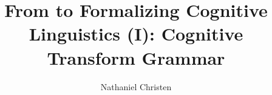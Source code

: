 \documentclass[11pt,twocolumn]{article}
\begin{document}
\title{From  to 
Formalizing Cognitive Linguistics (I): Cognitive Transform Grammar}
\author{Nathaniel Christen}
\newsavebox{\qboxi}
\newsavebox{\qboxii}

\end{document}
